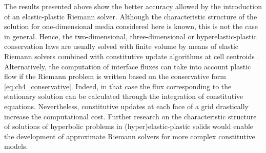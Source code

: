The results presented above show the better accuracy allowed by the introduction of an elastic-plastic Riemann solver.
Although the characteristic structure of the solution for one-dimensional media considered here is known, this is not the case in general.
Hence, the two-dimensional, three-dimensional or hyperelastic-plastic conservation laws are usually solved with finite volume by means of elastic Riemann solvers combined with constitutive update algorithms at cell centroids \cite{Haider_FVM,Salbasivan_elastoplastoc,Maire_elastoplast}.
Alternatively, the computation of interface fluxes can take into account plastic flow if the Riemann problem is written based on the conservative form \eqref{eq:ch4_conservative}.
Indeed, in that case the flux corresponding to the stationary solution can be calculated through the integration of constitutive equations.
Nevertheless, constitutive updates at each face of a grid drastically increase the computational cost.
Further research on the characteristic structure of solutions of hyperbolic problems in (hyper)elastic-plastic solids would enable the development of approximate Riemann solvers for more complex constitutive models.


